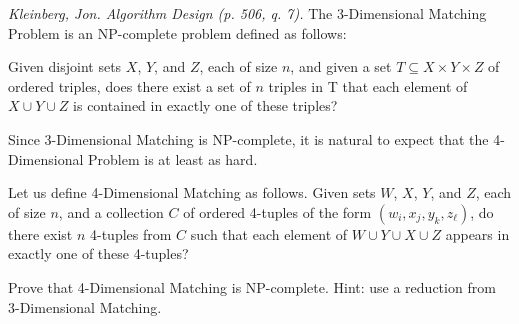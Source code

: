 \documentclass[solutionorbox,answers]{exam}
\begin{document}
\begin{questions}

\newpage

\question  \textit{Kleinberg, Jon. Algorithm Design (p. 506, q. 7).} The 3-Dimensional Matching Problem is an NP-complete problem defined as follows:

Given disjoint sets $X$, $Y$, and $Z$, each of size $n$, and given a set $T\subseteq X\times Y\times Z$ of ordered triples, does there exist a set of $n$ triples in T that each element of $X\cup Y\cup Z$ is contained in exactly one of these triples?

Since 3-Dimensional Matching is NP-complete, it is natural to expect that the 4-Dimensional Problem is at least as hard. 

Let us define 4-Dimensional Matching as follows. Given sets $W$, $X$, $Y$, and $Z$, each of size $n$, and a collection $C$ of ordered 4-tuples of the form $(w_i, x_j, y_k, z_\ell)$, do there exist $n$ 4-tuples from $C$ such that each element of $W \cup Y \cup X \cup Z$ appears in exactly one of these
4-tuples?

Prove that 4-Dimensional Matching is NP-complete. Hint: use a reduction from 3-Dimensional Matching.

  \begin{solutionbox}{} \vspace{1em} 
  \end{solutionbox}


\end{questions}
\end{document}
